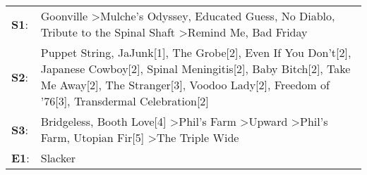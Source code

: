\begin{supertabular}{p{0.03\textwidth}p{0.92\textwidth}}
 \textbf{S1}:  &                                                                                                                                                                                                                             Goonville\textsuperscript{} \textgreater \enspace Mulche's Odyssey\textsuperscript{}, \enspace Educated Guess\textsuperscript{}, \enspace No Diablo\textsuperscript{}, \enspace Tribute to the Spinal Shaft\textsuperscript{} \textgreater \enspace Remind Me\textsuperscript{}, \enspace Bad Friday\textsuperscript{}  \enspace  \\
 \textbf{S2}:  &  Puppet String\textsuperscript{}, \enspace JaJunk[1]\textsuperscript{}, \enspace The Grobe[2]\textsuperscript{}, \enspace Even If You Don't[2]\textsuperscript{}, \enspace Japanese Cowboy[2]\textsuperscript{}, \enspace Spinal Meningitis[2]\textsuperscript{}, \enspace Baby Bitch[2]\textsuperscript{}, \enspace Take Me Away[2]\textsuperscript{}, \enspace The Stranger[3]\textsuperscript{}, \enspace Voodoo Lady[2]\textsuperscript{}, \enspace Freedom of '76[3]\textsuperscript{}, \enspace Transdermal Celebration[2]\textsuperscript{}  \enspace  \\
 \textbf{S3}:  &                                                                                                                                                                                                                   Bridgeless\textsuperscript{}, \enspace Booth Love[4]\textsuperscript{} \textgreater \enspace Phil's Farm\textsuperscript{} \textgreater \enspace Upward\textsuperscript{} \textgreater \enspace Phil's Farm\textsuperscript{}, \enspace Utopian Fir[5]\textsuperscript{} \textgreater \enspace The Triple Wide\textsuperscript{}  \enspace  \\
 \textbf{E1}:  &                                                                                                                                                                                                                                                                                                                                                                                                                                                                                                                          Slacker\textsuperscript{}  \enspace  \\
\end{supertabular}
